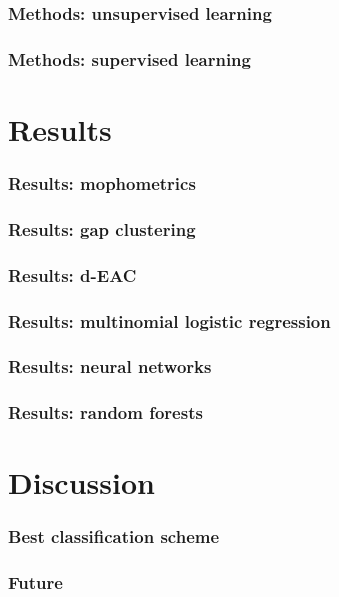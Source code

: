\documentclass{beamer}\usepackage{graphicx, color}
\begin{document}
\begin{frame}
  \frametitle{Methods: unsupervised learning}
\end{frame}

\begin{frame}
  \frametitle{Methods: supervised learning}
\end{frame}


\section{Results}
\begin{frame}
  \frametitle{Results: mophometrics}
\end{frame}

\begin{frame}
  \frametitle{Results: gap clustering}
\end{frame}

\begin{frame}
  \frametitle{Results: d-EAC}
\end{frame}

\begin{frame}
  \frametitle{Results: multinomial logistic regression}
\end{frame}

\begin{frame}
  \frametitle{Results: neural networks}
\end{frame}

\begin{frame}
  \frametitle{Results: random forests}
\end{frame}


\section{Discussion}
\begin{frame}
  \frametitle{Best classification scheme}
\end{frame}

\begin{frame}
  \frametitle{Future}
\end{frame}
\end{document}
